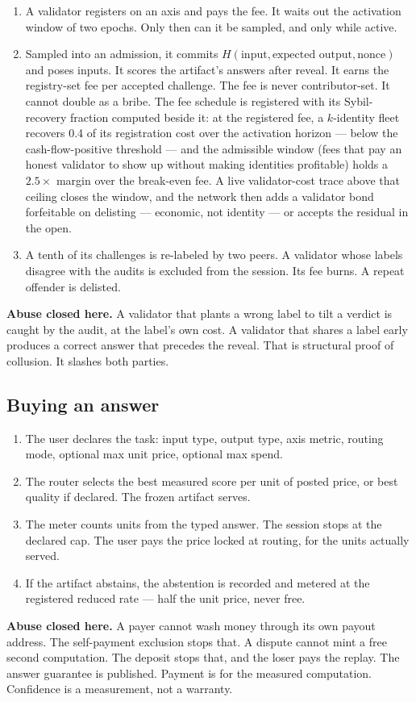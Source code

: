 \documentclass[11pt]{article}
\begin{document}
\begin{enumerate}
\item A validator registers on an axis and pays the fee. It
waits out the activation window of two epochs. Only then can it
be sampled, and only while active.
\item Sampled into an admission, it commits
$H(\text{input}, \text{expected output}, \text{nonce})$ and poses
inputs. It scores the artifact's answers after reveal. It earns
the registry-set fee per accepted challenge. The fee is never
contributor-set. It cannot double as a bribe. The fee schedule
is registered with its Sybil-recovery fraction computed beside
it: at the registered fee, a $k$-identity fleet recovers 0.4 of
its registration cost over the activation horizon --- below the
cash-flow-positive threshold --- and the admissible window (fees
that pay an honest validator to show up without making
identities profitable) holds a $2.5\times$ margin over the
break-even fee. A live validator-cost trace above that ceiling
closes the window, and the network then adds a validator bond
forfeitable on delisting --- economic, not identity --- or
accepts the residual in the open.
\item A tenth of its challenges is re-labeled by two peers. A
validator whose labels disagree with the audits is excluded from
the session. Its fee burns. A repeat offender is delisted.
\end{enumerate}
\textbf{Abuse closed here.} A validator that plants a wrong label
to tilt a verdict is caught by the audit, at the label's own
cost. A validator that shares a label early produces a correct
answer that precedes the reveal. That is structural proof of
collusion. It slashes both parties.

\subsection{Buying an answer}

\begin{enumerate}
\item The user declares the task: input type, output type, axis
metric, routing mode, optional max unit price, optional max
spend.
\item The router selects the best measured score per unit of
posted price, or best quality if declared. The frozen artifact
serves.
\item The meter counts units from the typed answer. The session
stops at the declared cap. The user pays the price locked at
routing, for the units actually served.
\item If the artifact abstains, the abstention is recorded and
metered at the registered reduced rate --- half the unit price,
never free.
\end{enumerate}
\textbf{Abuse closed here.} A payer cannot wash money through its
own payout address. The self-payment exclusion stops that. A
dispute cannot mint a free second computation. The deposit stops
that, and the loser pays the replay. The answer guarantee is
published. Payment is for the measured computation. Confidence is
a measurement, not a warranty.
\end{document}

